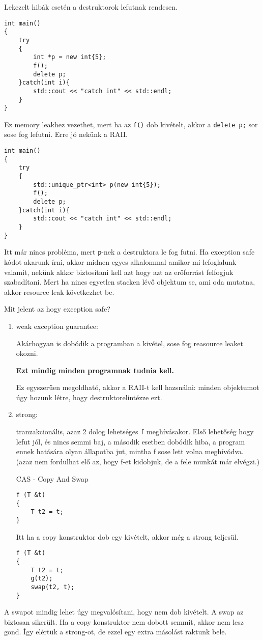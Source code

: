 \documentclass[a4paper,11.5pt]{article}
\begin{document}
		Lekezelt hibák esetén a destruktorok lefutnak rendesen.
		\begin{lstlisting}
int main()
{
	try
	{
		int *p = new int{5};
		f();
		delete p;
	}catch(int i){
		std::cout << "catch int" << std::endl;
	}
}
		\end{lstlisting}
		
		Ez memory leakhez vezethet, mert ha az \texttt{f()} dob kivételt, akkor a \texttt{delete p;} sor sose fog lefutni. Erre jó nekünk a RAII. 
		
		\begin{lstlisting}
int main()
{
	try
	{
		std::unique_ptr<int> p(new int{5});
		f();
		delete p;
	}catch(int i){
		std::cout << "catch int" << std::endl;
	}
}
		\end{lstlisting}
		
		Itt már nincs probléma, mert \texttt{p}-nek a destruktora le fog futni. Ha exception safe kódot akarunk írni, akkor midnen egyes alkalommal amikor mi lefoglalunk valamit, nekünk akkor biztosítani kell azt hogy azt az erőforrást felfogjuk szabadítani. Mert ha nincs egyetlen stacken lévő objektum se, ami oda mutatna, akkor resource leak következhet be.
		
		Mit jelent az hogy exception safe?
		
		\begin{enumerate}
			\item weak exception guarantee:
			
			Akárhogyan is dobódik a programban a kivétel, sose fog reasource leaket okozni.
			
			\textbf{Ezt mindig minden programnak tudnia kell.}
			
			Ez egyszerűen megoldható, akkor a RAII-t kell hazsnálni: minden objektumot úgy hozunk létre, hogy  destruktorelintézze ezt.
			
			\item strong:
			
			tranzakcionális, azaz 2 dolog lehetséges \texttt{f} meghívásakor. Első lehetőség hogy lefut jól, és nincs semmi baj, a második esetben dobódik hiba, a program ennek hatására olyan állapotba jut, mintha f sose lett volna meghívódva. (azaz nem fordulhat elő az, hogy f-et kidobjuk, de a fele munkát már elvégzi.)
			
			CAS - Copy And Swap
			\begin{lstlisting}
f (T &t)
{
	T t2 = t;
}
			\end{lstlisting}
			
			Itt ha a copy konstruktor dob egy kivételt, akkor még a strong teljesül.
			
			\begin{lstlisting}
f (T &t)
{
	T t2 = t;
	g(t2);	
	swap(t2, t);
}
			\end{lstlisting}
			
		\end{enumerate}
			A swapot mindig lehet úgy megvalósítani, hogy nem dob kivételt. A swap az biztosan sikerült. Ha a copy konstruktor nem dobott semmit, akkor nem lesz gond. Így elértük a strong-ot, de ezzel egy extra másolást raktunk bele.
			
\end{document}
